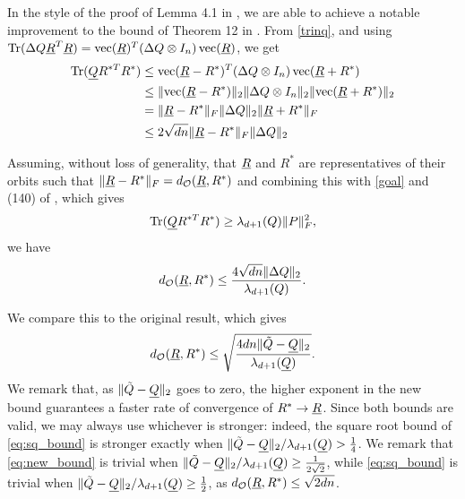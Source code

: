 \documentclass[12pt]{article}
\begin{document}
In the style of the proof of Lemma 4.1 in \cite{bandeira2016tightness}, we are able to achieve a notable improvement to the bound of Theorem 12 in \cite{bandeira2016se_sync}.  From \eqref{trinq}, and using $\operatorname{Tr}(\Delta Q \underline{R}^T \underline{R}) = \operatorname{vec}(\underline{R})^T (\Delta Q \otimes I_n) \operatorname{vec}(\underline{R})$, we get \begin{align*} \operatorname{Tr}(\underline{Q} R^{*T} R^*) &\le \operatorname{vec}(\underline{R} - R^*)^T (\Delta Q \otimes I_n) \operatorname{vec}(\underline{R} + R^*) \\ &\le \lVert\operatorname{vec}(\underline{R} - R^*)\rVert_2 \lVert\Delta Q \otimes I_n\rVert_2 \lVert\operatorname{vec}(\underline{R} + R^*)\rVert_2 \\ &= \lVert\underline{R} - R^*\rVert_F \lVert\Delta Q\rVert_2 \lVert\underline{R} + R^*\rVert_F \\ &\le 2\sqrt{dn} \lVert\underline{R} - R^*\rVert_F \lVert\Delta Q\rVert_2\end{align*}

Assuming, without loss of generality, that $\underline{R}$ and $R^*$ are representatives of their orbits such that $\lVert\underline{R} - R^*\rVert_F = d_{\mathcal{O}}(\underline{R}, R^*)$ and combining this with \eqref{goal} and (140) of \cite{bandeira2016se_sync}, which gives \[\operatorname{Tr}(\underline{Q} R^{*T} R^*) \ge \lambda_{d + 1}(Q) \lVert P\rVert_F^2,\] we have \begin{equation} d_{\mathcal{O}}(\underline{R}, R^*) \le \dfrac{4 \sqrt{dn} \lVert\Delta Q\rVert_2}{\lambda_{d + 1}(Q)}. \label{eq:new_bound}\end{equation}

We compare this to the original result, which gives \begin{equation} d_{\mathcal{O}}(\underline{R}, R^*) \le \sqrt{\dfrac{4 dn \lVert\tilde{Q} - \underline{Q}\rVert_2}{\lambda_{d + 1}(\underline{Q})}}. \label{eq:sq_bound} \end{equation}  We remark that, as $\lVert\tilde{Q} - \underline{Q}\rVert_2$ goes to zero, the higher exponent in the new bound guarantees a faster rate of convergence of $R^* \to \underline{R}$.  Since both bounds are valid, we may always use whichever is stronger: indeed, the square root bound of \eqref{eq:sq_bound} is stronger exactly when $\lVert\tilde{Q} - \underline{Q}\rVert_2 / \lambda_{d + 1}(\underline{Q}) > \frac{1}{4}$.  We remark that \eqref{eq:new_bound} is trivial when $\lVert\tilde{Q} - \underline{Q}\rVert_2 / \lambda_{d + 1}(\underline{Q}) \ge \frac{1}{2 \sqrt{2}}$, while \eqref{eq:sq_bound} is trivial when $\lVert\tilde{Q} - \underline{Q}\rVert_2 / \lambda_{d + 1}(\underline{Q}) \ge \frac{1}{2}$, as $d_{\mathcal{O}}(\underline{R}, R^*) \le \sqrt{2 d n}$.


\end{document}
